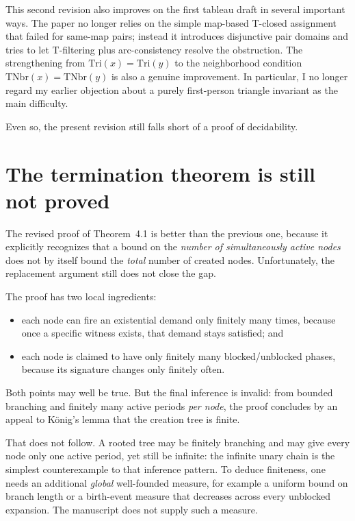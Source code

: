 \documentclass[11pt]{article}
\newcommand{\Tri}{\mathrm{Tri}}
\newcommand{\TNbr}{\mathrm{TNbr}}
\begin{document}
This second revision also improves on the first tableau draft in several important ways.
The paper no longer relies on the simple map-based T-closed assignment that failed for
same-map pairs; instead it introduces disjunctive pair domains and tries to let T-filtering
plus arc-consistency resolve the obstruction. The strengthening from \(\Tri(x)=\Tri(y)\)
to the neighborhood condition \(\TNbr(x)=\TNbr(y)\) is also a genuine improvement.
In particular, I no longer regard my earlier objection about a purely first-person
triangle invariant as the main difficulty.

Even so, the present revision still falls short of a proof of decidability.

\section{The termination theorem is still not proved}

The revised proof of Theorem~4.1 is better than the previous one, because it explicitly
recognizes that a bound on the \emph{number of simultaneously active nodes} does not by
itself bound the \emph{total} number of created nodes. Unfortunately, the replacement
argument still does not close the gap.

The proof has two local ingredients:
\begin{itemize}
    \item each node can fire an existential demand only finitely many times, because once a
    specific witness exists, that demand stays satisfied; and
    \item each node is claimed to have only finitely many blocked/unblocked phases, because
    its signature changes only finitely often.
\end{itemize}
Both points may well be true. But the final inference is invalid: from bounded branching
and finitely many active periods \emph{per node}, the proof concludes by an appeal to
K\"onig's lemma that the creation tree is finite.

That does not follow. A rooted tree may be finitely branching and may give every node only
one active period, yet still be infinite: the infinite unary chain is the simplest counterexample
to that inference pattern. To deduce finiteness, one needs an additional \emph{global}
well-founded measure, for example a uniform bound on branch length or a birth-event measure
that decreases across every unblocked expansion. The manuscript does not supply such a
measure.
\end{document}
